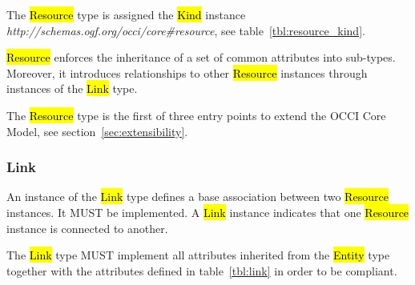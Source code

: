 \documentclass[10pt,a4paper]{article}
\begin{document}
The \hl{Resource} type is assigned the \hl{Kind} instance
\textit{http://schemas.ogf.org/occi/core\#resource}, see
table~\ref{tbl:resource_kind}.
%

\hl{Resource} enforces the inheritance of a set of common attributes
into sub-types. Moreover, it introduces relationships to other
\hl{Resource} instances through instances of the \hl{Link} type.

The \hl{Resource} type is the first of three entry points to extend
the OCCI Core Model, see section~\ref{sec:extensibility}.

\subsubsection{Link}
\label{sec:link}
An instance of the \hl{Link} type defines a base association between
two \hl{Resource} instances. It MUST be implemented. A \hl{Link}
instance indicates that one \hl{Resource} instance is connected to
another.

The \hl{Link} type MUST implement all attributes inherited from the
\hl{Entity} type together with the attributes defined in
table~\ref{tbl:link} in order to be compliant.

\end{document}
